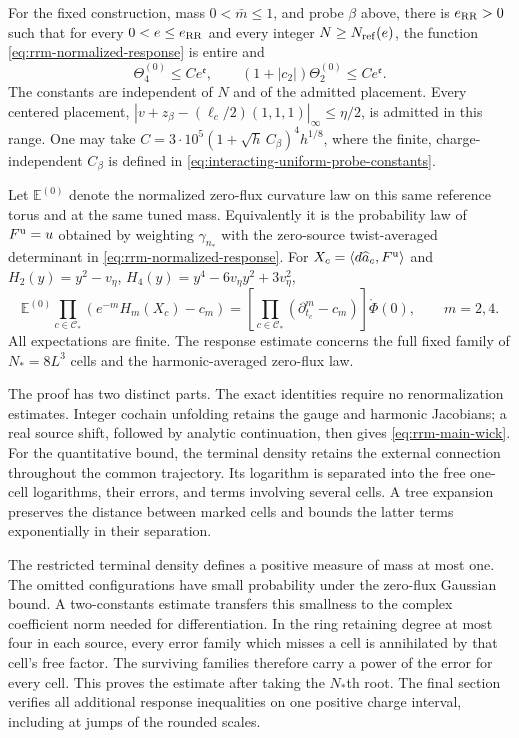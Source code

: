 \documentclass[11pt,letterpaper,reqno]{amsart}
\begin{document}
\begin{theorem}\label{thm:rrm-main}
For the fixed construction, mass $0<\bar m\le1$, and probe $\beta$
above, there is $e_{\rm RR}>0$ such that for every
$0<e\le e_{\rm RR}$ and every integer $N\ge N_{\rm ref}(e)$,
the function \eqref{eq:rrm-normalized-response} is entire and
\begin{equation}\label{eq:rrm-main-bound}
 \Theta_4^{(0)}\le C e^{\mathfrak e},\qquad
 (1+|c_2|)\Theta_2^{(0)}\le C e^{\mathfrak e}.
\end{equation}
The constants are independent of $N$ and of the admitted placement.
Every centered placement,
$|v+z_\beta-(\ell_c/2)(1,1,1)|_\infty\le\eta/2$, is admitted
in this range. One may take
$C=3\cdot10^5(1+\sqrt h\,C_\beta)^4h^{1/8}$,
where the finite, charge-independent $C_\beta$ is defined in
\eqref{eq:interacting-uniform-probe-constants}.

Let $\mathbb E^{(0)}$ denote the normalized zero-flux curvature law
on this same reference torus and at the same tuned mass.
Equivalently it is the probability law of $F^{\rm u}=u$ obtained
by weighting $\gamma_{n_*}$ with the zero-source twist-averaged
determinant in \eqref{eq:rrm-normalized-response}.
For $X_c=\langle d\widehat a_c,F^{\rm u}\rangle$ and
$H_2(y)=y^2-v_\eta$, $H_4(y)=y^4-6v_\eta y^2+3v_\eta^2$,
\begin{equation}\label{eq:rrm-main-wick}
 \mathbb E^{(0)}\prod_{c\in\mathcal C_*}
             (e^{-m}H_m(X_c)-c_m)
       =\left[\prod_{c\in\mathcal C_*}
           (\partial_{t_c}^m-c_m)\right]\mathring\Phi(0),
 \qquad m=2,4.
\end{equation}
All expectations are finite. The response estimate concerns the full
fixed family of $N_*=8L^3$ cells and the harmonic-averaged zero-flux law.
\end{theorem}

The proof has two distinct parts. The exact identities require no
renormalization estimates. Integer cochain unfolding retains the gauge
and harmonic Jacobians; a real source shift, followed by analytic
continuation, then gives \eqref{eq:rrm-main-wick}.
For the quantitative bound, the terminal density retains the external
connection throughout the common trajectory. Its logarithm is separated
into the free one-cell logarithms, their errors, and terms involving
several cells. A tree expansion preserves the distance between marked
cells and bounds the latter terms exponentially in their separation.

The restricted terminal density defines a positive measure of mass at
most one. The omitted configurations have small probability under the
zero-flux Gaussian bound. A two-constants estimate transfers this
smallness to the complex coefficient norm needed for differentiation.
In the ring retaining degree at most four in each source, every error
family which misses a cell is annihilated by that cell's free factor.
The surviving families therefore carry a power of the error for every
cell. This proves the estimate after taking the $N_*$th root.
The final section verifies all additional response inequalities on one
positive charge interval, including at jumps of the rounded scales.
\end{document}
